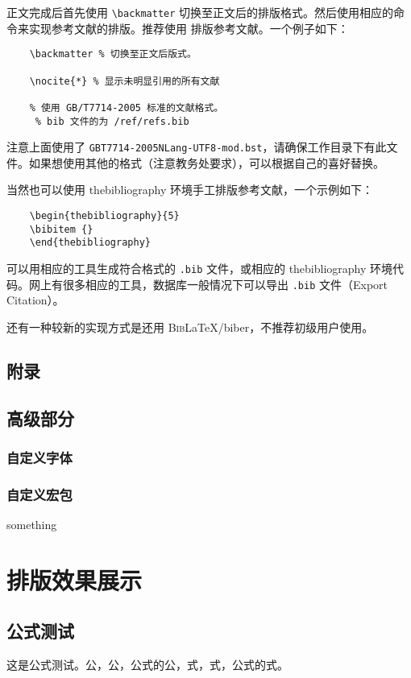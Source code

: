 \documentclass[%
               amsthm,
              ]{xjtubsc}
\begin{document}
正文完成后首先使用 \verb|\backmatter| 切换至正文后的排版格式。然后使用相应的命令来实现参考文献的排版。推荐使用  排版参考文献。一个例子如下：
\begin{verbatim}
    \backmatter % 切换至正文后版式。

    \nocite{*} % 显示未明显引用的所有文献
     
    % 使用 GB/T7714-2005 标准的文献格式。
     % bib 文件的为 /ref/refs.bib
\end{verbatim}
注意上面使用了 \verb|GBT7714-2005NLang-UTF8-mod.bst|，请确保工作目录下有此文件。如果想使用其他的格式（注意教务处要求），可以根据自己的喜好替换。

当然也可以使用 thebibliography 环境手工排版参考文献，一个示例如下：
\begin{verbatim}
    \begin{thebibliography}{5}
    \bibitem {}
    \end{thebibliography}
\end{verbatim}

可以用相应的工具生成符合格式的 \verb|.bib| 文件，或相应的 thebibliography 环境代码。网上有很多相应的工具，数据库一般情况下可以导出 \verb|.bib| 文件（Export Citation）。

还有一种较新的实现方式是还用 \textsc{Bib}\LaTeX{}/biber，不推荐初级用户使用。
\subsection{附录}

\subsection{高级部分}

\subsubsection{自定义字体}\label{sec:customfont}
\subsubsection{自定义宏包}
something

\section{排版效果展示}

\subsection{公式测试}
这是公式测试。公，公，公式的公，式，式，公式的式。
\end{document}
